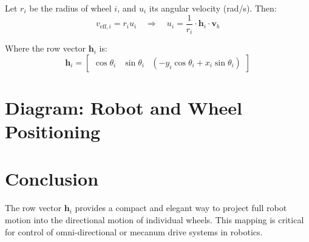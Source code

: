 \documentclass[11pt]{article}
\begin{document}
Let \( r_i \) be the radius of wheel \( i \), and \( u_i \) its angular velocity (rad/s). Then:
\[
v_{\text{eff}, i} = r_i u_i
\quad \Rightarrow \quad
u_i = \frac{1}{r_i} \cdot \mathbf{h}_i \cdot \mathbf{v}_b
\]

Where the row vector \( \mathbf{h}_i \) is:
\[
\boxed{
\mathbf{h}_i = \begin{bmatrix}
\cos\theta_i &
\sin\theta_i &
(-y_i\cos\theta_i + x_i\sin\theta_i)
\end{bmatrix}
}
\]

\section{Diagram: Robot and Wheel Positioning}

\begin{center}
\end{center}

\section{Conclusion}

The row vector \( \mathbf{h}_i \) provides a compact and elegant way to project full robot motion into the directional motion of individual wheels. This mapping is critical for control of omni-directional or mecanum drive systems in robotics.
\end{document}
